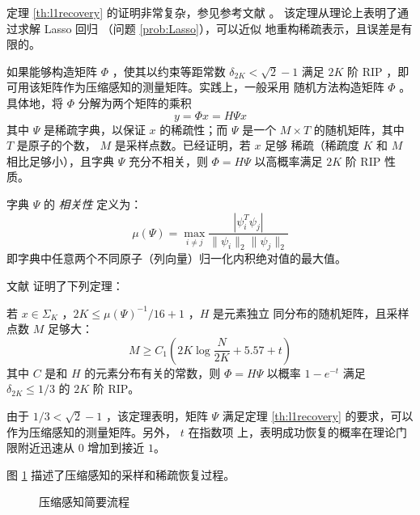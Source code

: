 定理 \ref{th:l1recovery} 的证明非常复杂，参见参考文献 \cite{RIPimplieCS}。
该定理从理论上表明了通过求解 Lasso 回归 （问题 \ref{prob:Lasso}），可以近似
地重构稀疏表示，且误差是有限的。

如果能够构造矩阵 $\Phi$ ，使其以约束等距常数 $\delta_{2K} < \sqrt{2}-1$
满足 $2K$ 阶 RIP ，即可用该矩阵作为压缩感知的测量矩阵。实践上，一般采用
随机方法构造矩阵 $\Phi$ 。具体地，将 $\Phi$ 分解为两个矩阵的乘积
\begin{equation}
y = \Phi x = H \Psi x
\end{equation}
其中 $\Psi$ 是稀疏字典，以保证 $x$ 的稀疏性；而 $\Psi$ 是一个 $M \times T$
的随机矩阵，其中 $T$ 是原子的个数， $M$ 是采样点数。已经证明，若 $x$ 足够
稀疏（稀疏度 $K$ 和 $M$ 相比足够小），且字典 $\Psi$ 充分不相关，则
$\Phi = H \Psi$ 以高概率满足 $2K$ 阶 RIP 性质。
\begin{definition}[相关性]
字典 $\Psi$ 的 \emph{相关性} 定义为：
\begin{equation}
\mu(\Psi) = \max_{i \neq j} \frac{|\psi_i^T \psi_j|}{\|\psi_i\|_2
\|\psi_j\|_2}
\end{equation}
即字典中任意两个不同原子（列向量）归一化内积绝对值的最大值。
\end{definition}

文献 \cite{CSRedundant} 证明了下列定理：
\begin{theorem}
若 $x \in \Sigma_K$ ，$2K \leq \mu(\Psi)^{-1}/16+1$ ，$H$ 是元素独立
同分布的随机矩阵，且采样点数 $M$ 足够大：
\begin{equation}
M \geq C_1(2K \log \frac{N}{2K} + 5.57 + t)
\end{equation}
其中 $C$ 是和 $H$ 的元素分布有关的常数，则 $\Phi = H \Psi$ 以概率
$1 - e^{-t}$ 满足 $\delta_{2K} \leq 1/3$ 的 $2K$ 阶 RIP。
\end{theorem}

由于 $1/3 < \sqrt{2} - 1$ ，该定理表明，矩阵 $\Psi$ 满足定理
\ref{th:l1recovery} 的要求，可以作为压缩感知的测量矩阵。另外， $t$ 在指数项
上，表明成功恢复的概率在理论门限附近迅速从 $0$ 增加到接近 $1$。

图 \ref{fig:CS} 描述了压缩感知的采样和稀疏恢复过程。

\begin{figure}
\centering
{} %
\caption{压缩感知简要流程}
\label{fig:CS}
\end{figure}

